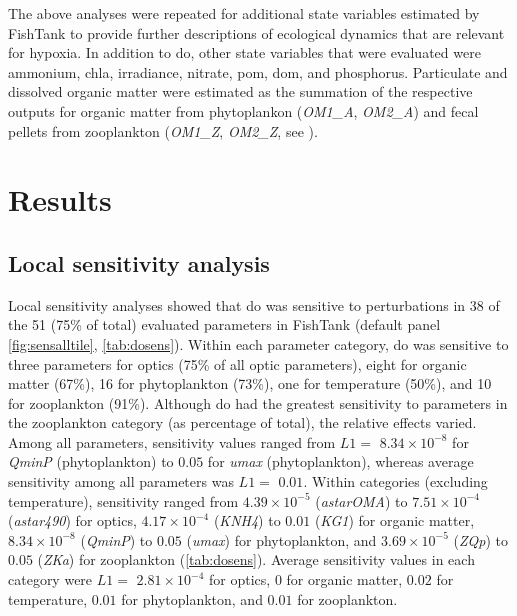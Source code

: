 \documentclass[letterpaper,12pt,oneside]{article}\usepackage[]{graphicx}\usepackage[]{color}
\begin{document}
The above analyses were repeated for additional state variables estimated by FishTank to provide further descriptions of ecological dynamics that are relevant for hypoxia.  In addition to \ac{do}, other state variables that were evaluated were ammonium, \ac{chla}, irradiance, nitrate, \ac{pom}, \ac{dom}, and phosphorus.  Particulate and dissolved organic matter were estimated as the summation of the respective outputs for organic matter from phytoplankon (\textit{OM1\_A}, \textit{OM2\_A}) and fecal pellets from zooplankton (\textit{OM1\_Z}, \textit{OM2\_Z}, see ). 

\section{Results}


 
\subsection{Local sensitivity analysis}

Local sensitivity analyses showed that \ac{do} was sensitive to perturbations in 38 of the 51 (75\% of total) evaluated parameters in FishTank (default panel \cref{fig:sensalltile}, \cref{tab:dosens}). Within each parameter category, \ac{do} was sensitive to three parameters for optics (75\% of all optic parameters), eight for organic matter (67\%), 16 for phytoplankton (73\%), one for temperature (50\%), and 10 for zooplankton (91\%). Although \ac{do} had the greatest sensitivity to parameters in the zooplankton category (as percentage of total), the relative effects varied. Among all parameters, sensitivity values ranged from $L1 = $ $8.34\times 10^{-8}$ for \textit{QminP} (phytoplankton) to $0.05$ for \textit{umax} (phytoplankton), whereas average sensitivity among all parameters was $L1 = $ $0.01$. Within categories (excluding temperature), sensitivity ranged from $4.39\times 10^{-5}$ (\textit{astarOMA}) to $7.51\times 10^{-4}$ (\textit{astar490}) for optics, $4.17\times 10^{-4}$ (\textit{KNH4}) to $0.01$ (\textit{KG1}) for organic matter, $8.34\times 10^{-8}$ (\textit{QminP}) to $0.05$ (\textit{umax}) for phytoplankton, and $3.69\times 10^{-5}$ (\textit{ZQp}) to $0.05$ (\textit{ZKa}) for zooplankton (\cref{tab:dosens}).  Average sensitivity values in each category were $L1 = $ $2.81\times 10^{-4}$ for optics, $0$ for organic matter, $0.02$ for temperature, $0.01$ for phytoplankton, and $0.01$ for zooplankton.
\end{document}

